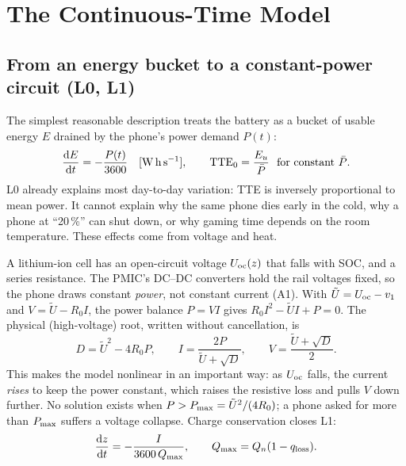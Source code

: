 \section{The Continuous-Time Model}\label{sec:model}

\subsection{From an energy bucket to a constant-power circuit (L0, L1)}\label{sec:L0L1}
The simplest reasonable description treats the battery as a bucket of usable energy $E$ drained by the phone's
power demand $P(t)$:
\begin{equation}
  \frac{\mathrm{d} E}{\mathrm{d} t} = -\frac{P(t)}{3600}\quad[\mathrm{W\,h\,s^{-1}}],\qquad
  \mathrm{TTE}_0=\frac{E_u}{\bar P}\ \ \text{for constant } \bar P. \label{eq:L0}
\end{equation}
L0 already explains most day-to-day variation: TTE is inversely proportional to mean power. It cannot explain why
the same phone dies early in the cold, why a phone at ``20\,\%'' can shut down, or why gaming time depends on the
room temperature. These effects come from voltage and heat.

A lithium-ion cell has an open-circuit voltage $U_{\mathrm{oc}}(z)$ that falls with SOC, and a series resistance. The
PMIC's DC--DC converters hold the rail voltages fixed, so the phone draws constant \emph{power}, not constant current
(A1). With $\tilde U=U_{\mathrm{oc}}-v_1$ and $V=\tilde U-R_0I$, the power balance $P=VI$ gives $R_0I^2-\tilde UI+P=0$. The
physical (high-voltage) root, written without cancellation, is
\begin{equation}
  D=\tilde U^{2}-4R_0P,\qquad I=\frac{2P}{\tilde U+\sqrt D},\qquad V=\frac{\tilde U+\sqrt D}{2}. \label{eq:current}
\end{equation}
This makes the model nonlinear in an important way: as $U_{\mathrm{oc}}$ falls, the current \emph{rises} to keep the power
constant, which raises the resistive loss and pulls $V$ down further. No solution exists when
$P>P_{\max}=\tilde U^2/(4R_0)$; a phone asked for more than $P_{\max}$ suffers a voltage collapse. Charge conservation
closes L1:
\begin{equation}
  \frac{\mathrm{d}z}{\mathrm{d} t}=-\frac{I}{3600\,Q_{\max}},\qquad Q_{\max}=Q_n(1-q_{\mathrm{loss}}). \label{eq:soc}
\end{equation}

